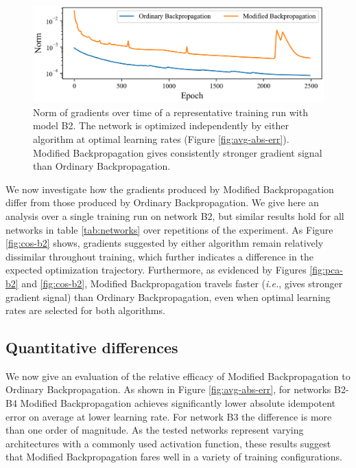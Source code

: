 \documentclass{article}
\theoremstyle{plain}
\theoremstyle{definition}
\theoremstyle{remark}
\begin{document}
\begin{figure}[h]
    \centering
    \includegraphics[width=0.95\columnwidth]{./resources/norm.png}
    \caption{Norm of gradients over time of a representative training run with model B2. The network is optimized independently by either algorithm at optimal learning rates (Figure \ref{fig:avg-abs-err}). Modified Backpropagation gives consistently stronger gradient signal than Ordinary Backpropagation.}
    \label{fig:norm-b2}
\end{figure}

We now investigate how the gradients produced by Modified Backpropagation differ from those produced by Ordinary Backpropagation. We give here an analysis over a single training run on network B2, but similar results hold for all networks in table \ref{tab:networks} over repetitions of the experiment. As Figure \ref{fig:cos-b2} shows, gradients suggested by either algorithm remain relatively dissimilar throughout training, which further indicates a difference in the expected optimization trajectory. Furthermore, as evidenced by Figures \ref{fig:pca-b2} and \ref{fig:cos-b2}, Modified Backpropagation travels faster (\textit{i.e.}, gives stronger gradient signal) than Ordinary Backpropagation, even when optimal learning rates are selected for both algorithms.

\subsection{Quantitative differences}
\label{sec:experiment-quant}
We now give an evaluation of the relative efficacy of Modified Backpropagation to Ordinary Backpropagation. As shown in Figure \ref{fig:avg-abs-err}, for networks B2-B4 Modified Backpropagation achieves significantly lower absolute idempotent error on average at lower learning rate. For network B3 the difference is more than one order of magnitude. As the tested networks represent varying architectures with a commonly used activation function, these results suggest that Modified Backpropagation fares well in a variety of training configurations.
\end{document}
